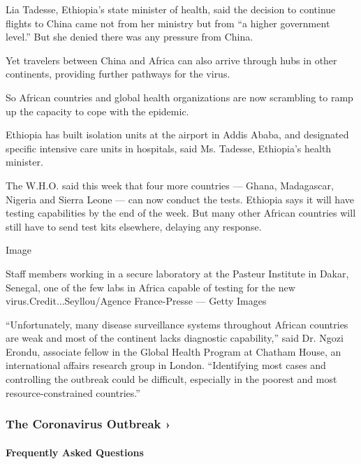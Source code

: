 Lia Tadesse, Ethiopia's state minister of health, said the decision to
continue flights to China came not from her ministry but from ``a higher
government level.'' But she denied there was any pressure from China.

Yet travelers between China and Africa can also arrive through hubs in
other continents, providing further pathways for the virus.

So African countries and global health organizations are now scrambling
to ramp up the capacity to cope with the epidemic.

Ethiopia has built isolation units at the airport in Addis Ababa, and
designated specific intensive care units in hospitals, said Ms. Tadesse,
Ethiopia's health minister.

The W.H.O. said this week that four more countries --- Ghana,
Madagascar, Nigeria and Sierra Leone --- can now conduct the tests.
Ethiopia says it will have testing capabilities by the end of the week.
But many other African countries will still have to send test kits
elsewhere, delaying any response.

Image

Staff members working in a secure laboratory at the Pasteur Institute in
Dakar, Senegal, one of the few labs in Africa capable of testing for the
new virus.Credit...Seyllou/Agence France-Presse --- Getty Images

``Unfortunately, many disease surveillance systems throughout African
countries are weak and most of the continent lacks diagnostic
capability,'' said Dr. Ngozi Erondu, associate fellow in the Global
Health Program at Chatham House, an international affairs research group
in London. ``Identifying most cases and controlling the outbreak could
be difficult, especially in the poorest and most resource-constrained
countries.''

\href{https://www.nytimes.com/news-event/coronavirus?action=click\&pgtype=Article\&state=default\&region=MAIN_CONTENT_3\&context=storylines_faq}{}

\hypertarget{the-coronavirus-outbreak-}{%
\subsubsection{The Coronavirus Outbreak
›}\label{the-coronavirus-outbreak-}}

\hypertarget{frequently-asked-questions}{%
\paragraph{Frequently Asked
Questions}\label{frequently-asked-questions}}

